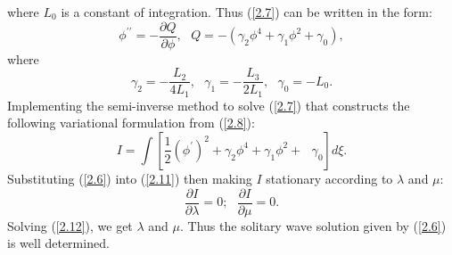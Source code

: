 \documentclass[12pt]{llncs}
\begin{document}
where $L_{0}$ is a constant of integration. Thus (\ref{2.7}) can be written in the
form:%
\begin{equation}\label{2.9}
	\phi^{\prime \prime }=-\frac{\partial Q}{\partial \phi},\text{ }Q=-\left( \gamma
	_{2}\phi^{4}+\gamma _{1}\phi^{2}+\gamma _{0}\right) ,
\end{equation}%
where
\begin{equation}\label{2.10}
	\gamma _{2}=-\frac{L_{2}}{4L_{1}},\text{ }\gamma _{1}=-\frac{L_{3}}{2L_{1}},
	\text{ }\gamma _{0}=-L_{0}.
\end{equation}%
Implementing the semi-inverse method \cite{He:1997,He:2006,N.Kudryashov:2009}  to solve (\ref{2.7}) that constructs
the following variational formulation from (\ref{2.8}):%
\begin{equation}\label{2.11}
	I=\int \left[ \frac{1}{2}\left( \phi^{\prime }\right) ^{2}+\gamma
	_{2}\phi^{4}+\gamma _{1}\phi^{2}+\text{ }\gamma _{0}\right] d\xi .
\end{equation}
Substituting (\ref{2.6}) into (\ref{2.11}) then making $I$ stationary according
to $\lambda $ and $\mu $:%
\begin{equation}\label{2.12}
	\frac{\partial I}{\partial \lambda}=0;\text{ }\frac{\partial I}{\partial
		\mu}=0.
\end{equation}
Solving (\ref{2.12}), we get $\lambda $ and $\mu.$ Thus the solitary wave solution given by (\ref{2.6})
is well determined.
\end{document}
